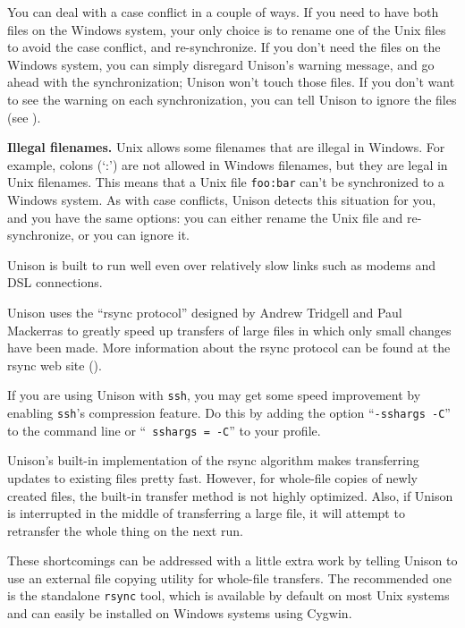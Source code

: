 \documentclass{article}
\begin{document}
You can deal with a case conflict in a couple of ways.  If you need to
have both files on the Windows system, your only choice is to rename
one of the Unix files to avoid the case conflict, and re-synchronize.
If you don't need the files on the Windows system, you can simply
disregard Unison's warning message, and go ahead with the
synchronization; Unison won't touch those files.  If you don't want to
see the warning on each synchronization, you can tell Unison to ignore
the files (see ).

\textbf{Illegal filenames.}  Unix allows some filenames that are
illegal in Windows.  For example, colons (`:') are not allowed in
Windows filenames, but they are legal in Unix filenames.  This means
that a Unix file \texttt{foo:bar} can't be synchronized to a Windows
system.  As with case conflicts, Unison detects this situation for
you, and you have the same options: you can either rename the Unix
file and re-synchronize, or you can ignore it.



Unison is built to run well even over relatively slow links such as
modems and DSL connections.

Unison uses the ``rsync protocol'' designed by Andrew Tridgell and Paul
Mackerras to greatly speed up transfers of large files in which only
small changes have been made.  More information about the rsync protocol
can be found at the rsync web site ().

If you are using Unison with {\tt ssh}, you may get some speed
improvement by enabling {\tt ssh}'s compression feature.  Do this by
adding the option ``{\tt -sshargs -C}'' to the command line or ``{\tt
  sshargs = -C}'' to your profile.



Unison's built-in implementation of the rsync algorithm makes transferring
updates to existing files pretty fast.  However, for whole-file copies of
newly created files, the built-in transfer method is not highly optimized.
Also, if Unison is interrupted in the middle of transferring a large file,
it will attempt to retransfer the whole thing on the next run.

These shortcomings can be addressed with a little extra work by telling
Unison to use an external file copying utility for whole-file transfers.
The recommended one is the standalone {\tt rsync} tool, which is available
by default on most Unix systems and can easily be installed on Windows
systems using Cygwin.
\end{document}
